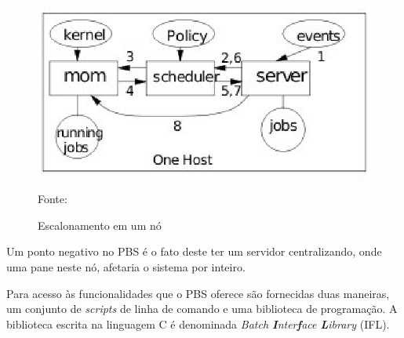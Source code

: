 \begin{figure}[htb]
\begin{center}
\includegraphics[scale=0.9]{./img/PbsMom.eps}
\caption{Escalonamento em um nó}
\label{fig:Pbs_MOM}
Fonte: \cite{Bayucan1998}
\end{center}
\end{figure}

Um ponto negativo no PBS é o fato deste ter um servidor centralizando, onde uma pane neste nó, afetaria o sistema por inteiro.

Para acesso às funcionalidades que o PBS oferece são fornecidas duas maneiras, um conjunto de \emph{scripts} de linha de comando e uma biblioteca de programação. A biblioteca escrita na linguagem C é denominada \emph{Batch {\bf I}nter{\bf f}ace {\bf L}ibrary} (IFL).